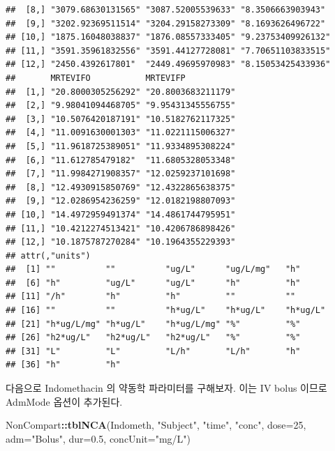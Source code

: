 \documentclass[12pt,]{krantz}
\newenvironment{Shaded}{\begin{snugshade}}{\end{snugshade}}
\newcommand{\KeywordTok}[1]{\textcolor[rgb]{0.13,0.29,0.53}{\textbf{#1}}}
\newcommand{\DataTypeTok}[1]{\textcolor[rgb]{0.13,0.29,0.53}{#1}}
\newcommand{\DecValTok}[1]{\textcolor[rgb]{0.00,0.00,0.81}{#1}}
\newcommand{\FloatTok}[1]{\textcolor[rgb]{0.00,0.00,0.81}{#1}}
\newcommand{\StringTok}[1]{\textcolor[rgb]{0.31,0.60,0.02}{#1}}
\newcommand{\OperatorTok}[1]{\textcolor[rgb]{0.81,0.36,0.00}{\textbf{#1}}}
\newcommand{\NormalTok}[1]{#1}
\theoremstyle{definition}
\theoremstyle{definition}
\theoremstyle{definition}
\theoremstyle{remark}
\begin{document}
\begin{verbatim}
##  [8,] "3079.68630131565" "3087.52005539633" "8.3506663903943" 
##  [9,] "3202.92369511514" "3204.29158273309" "8.1693626496722" 
## [10,] "1875.16048038837" "1876.08557333405" "9.23753409926132"
## [11,] "3591.35961832556" "3591.44127728081" "7.70651103833515"
## [12,] "2450.4392617801"  "2449.49695970983" "8.15053425433936"
##       MRTEVIFO           MRTEVIFP          
##  [1,] "20.8000305256292" "20.8003683211179"
##  [2,] "9.98041094468705" "9.95431345556755"
##  [3,] "10.5076420187191" "10.5182762117325"
##  [4,] "11.0091630001303" "11.0221115006327"
##  [5,] "11.9618725389051" "11.9334895308224"
##  [6,] "11.612785479182"  "11.6805328053348"
##  [7,] "11.9984271908357" "12.0259237101698"
##  [8,] "12.4930915850769" "12.4322865638375"
##  [9,] "12.0286954236259" "12.0182198807093"
## [10,] "14.4972959491374" "14.4861744795951"
## [11,] "10.4212274513421" "10.4206786898426"
## [12,] "10.1875787270284" "10.1964355229393"
## attr(,"units")
##  [1] ""          ""          "ug/L"      "ug/L/mg"   "h"        
##  [6] "h"         "ug/L"      "ug/L"      "h"         "h"        
## [11] "/h"        "h"         "h"         ""          ""         
## [16] ""          ""          "h*ug/L"    "h*ug/L"    "h*ug/L"   
## [21] "h*ug/L/mg" "h*ug/L"    "h*ug/L/mg" "%"         "%"        
## [26] "h2*ug/L"   "h2*ug/L"   "h2*ug/L"   "%"         "%"        
## [31] "L"         "L"         "L/h"       "L/h"       "h"        
## [36] "h"         "h"
\end{verbatim}

다음으로 Indomethacin 의 약동학 파라미터를 구해보자. 이는 IV bolus
이므로 AdmMode 옵션이 추가된다.

\begin{Shaded}
\begin{Highlighting}[]
\NormalTok{NonCompart}\OperatorTok{::}\KeywordTok{tblNCA}\NormalTok{(Indometh, }\StringTok{"Subject"}\NormalTok{, }\StringTok{"time"}\NormalTok{, }\StringTok{"conc"}\NormalTok{, }\DataTypeTok{dose=}\DecValTok{25}\NormalTok{, }\DataTypeTok{adm=}\StringTok{"Bolus"}\NormalTok{, }\DataTypeTok{dur=}\FloatTok{0.5}\NormalTok{, }\DataTypeTok{concUnit=}\StringTok{"mg/L"}\NormalTok{)}
\end{Highlighting}
\end{Shaded}
\end{document}
